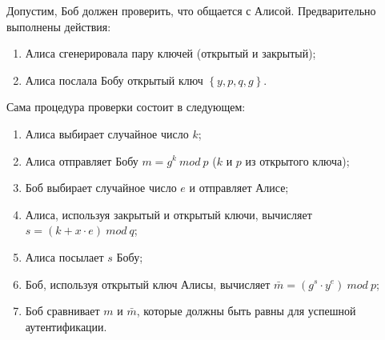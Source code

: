 Допустим, Боб должен проверить, что общается с Алисой. Предварительно выполнены действия:

\begin{enumerate}
\item Алиса сгенерировала пару ключей (открытый и закрытый);
\item Алиса послала Бобу открытый ключ $\left\{y, p, q, g\right\}$.
\end{enumerate}


Сама процедура проверки состоит в следующем:

\begin{enumerate}
\item Алиса выбирает случайное число $k$;
\item Алиса отправляет Бобу $m = g ^ k \ mod \ p$ ($k$ и $p$ из открытого ключа);
\item Боб выбирает случайное число $e$ и отправляет Алисе;
\item Алиса, используя закрытый и открытый ключи, вычисляет $s = (k + x \cdot e) \ mod \ q$;
\item Алиса посылает $s$ Бобу;
\item Боб, используя открытый ключ Алисы, вычисляет $\bar{m} = (g^s \cdot y^e) \ mod \ p$;
\item Боб сравнивает $m$ и $\bar{m}$, которые должны быть равны для успешной аутентификации.

\end{enumerate}